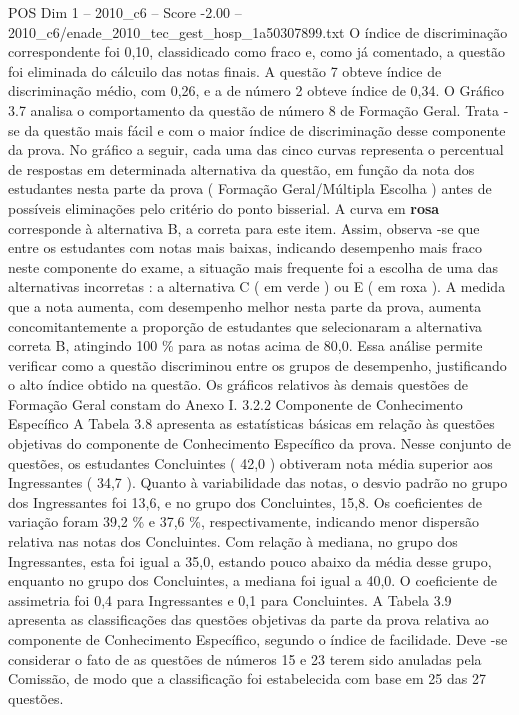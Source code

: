 \begin{textsample}{POS Dim 1 – 2010\_c6 – Score -2.00 – 2010\_c6/enade\_2010\_tec\_gest\_hosp\_1a50307899.txt}
O índice de discriminação correspondente foi 0,10, classidicado como fraco e, como já comentado, a questão foi eliminada do cálcuilo das notas finais.
A questão 7 obteve índice de discriminação médio, com 0,26, e a de número 2 obteve índice de 0,34.
O Gráfico 3.7 analisa o comportamento da questão de número 8 de Formação Geral.
Trata -se da questão mais fácil e com o maior índice de discriminação desse componente da prova.
No gráfico a seguir, cada uma das cinco curvas representa o percentual de respostas em determinada alternativa da questão, em função da nota dos estudantes nesta parte da prova ( Formação Geral/Múltipla Escolha ) antes de possíveis eliminações pelo critério do ponto bisserial.
A curva em \textbf{rosa} corresponde à alternativa B, a correta para este item.
Assim, observa -se que entre os estudantes com notas mais baixas, indicando desempenho mais fraco neste componente do exame, a situação mais frequente foi a escolha de uma das alternativas incorretas : a alternativa C ( em verde ) ou E ( em roxa ).
A medida que a nota aumenta, com desempenho melhor nesta parte da prova, aumenta concomitantemente a proporção de estudantes que selecionaram a alternativa correta B, atingindo 100 \% para as notas acima de 80,0.
Essa análise permite verificar como a questão discriminou entre os grupos de desempenho, justificando o alto índice obtido na questão.
Os gráficos relativos às demais questões de Formação Geral constam do Anexo I. 3.2.2 Componente de Conhecimento Específico A Tabela 3.8 apresenta as estatísticas básicas em relação às questões objetivas do componente de Conhecimento Específico da prova.
Nesse conjunto de questões, os estudantes Concluintes ( 42,0 ) obtiveram nota média superior aos Ingressantes ( 34,7 ).
Quanto à variabilidade das notas, o desvio padrão no grupo dos Ingressantes foi 13,6, e no grupo dos Concluintes, 15,8.
Os coeficientes de variação foram 39,2 \% e 37,6 \%, respectivamente, indicando menor dispersão relativa nas notas dos Concluintes.
Com relação à mediana, no grupo dos Ingressantes, esta foi igual a 35,0, estando pouco abaixo da média desse grupo, enquanto no grupo dos Concluintes, a mediana foi igual a 40,0.
O coeficiente de assimetria foi 0,4 para Ingressantes e 0,1 para Concluintes.
A Tabela 3.9 apresenta as classificações das questões objetivas da parte da prova relativa ao componente de Conhecimento Específico, segundo o índice de facilidade.
Deve -se considerar o fato de as questões de números 15 e 23 terem sido anuladas pela Comissão, de modo que a classificação foi estabelecida com base em 25 das 27 questões.

\end{textsample}
